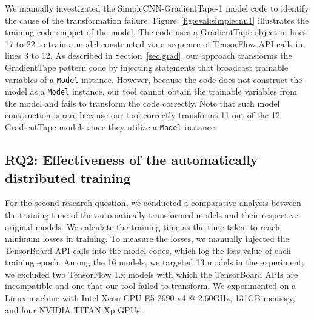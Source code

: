 We manually investigated the SimpleCNN-GradientTape-1 model code to 
identify the cause of the transformation failure.
Figure~\ref{fig:eval:simplecnn1} illustrates the training code snippet of the
model.
The code uses a GradientTape object in lines 17 to 22 to train a model
constructed via a sequence of TensorFlow API calls in lines 3 to 12.
As described in Section~\ref{sec:grad}, our approach transforms the
GradientTape pattern code by injecting statements that broadcast trainable
variables of a {\tt Model} instance.
However, because the code does not construct the model as a {\tt Model}
instance, our tool cannot obtain the trainable variables from the model and
fails to transform the code correctly.
Note that such model construction is rare because our tool correctly transforms
11 out of the 12 GradientTape models since they utilize a {\tt Model}
instance.


\subsection{RQ2: Effectiveness of the automatically distributed training}
For the second research question, we conducted a comparative analysis
between the training time of the automatically transformed models and their
respective original models.
We calculate the training time as the time taken to reach minimum losses in
training.
To measure the losses, we manually injected the TensorBoard\cite{tensorboard}
API calls into the model codes, which log the loss value of each training
epoch.
Among the 16 models, we targeted 13 models in the experiment; we excluded two
TensorFlow 1.x models with which the TensorBoard APIs are incompatible 
and one that our tool failed to transform.
We experimented on a Linux machine with Intel Xeon CPU E5-2690 v4 @
2.60GHz, 131GB memory, and four NVIDIA TITAN Xp GPUs.




